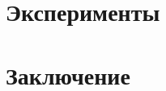 \documentclass [a4paper] {article}
\begin{document}
	
	
	\section{Эксперименты}
	
	\section{Заключение}
	
	
	\printbibliography
	
\end{document}
